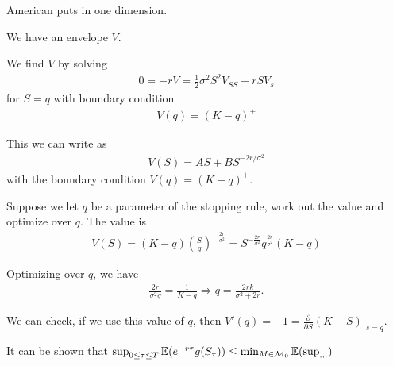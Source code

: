 \begin{exmp}
  \label{defn:market_models:5}
  American puts in one dimension.

  We have an envelope $V$.

  We find $V$ by solving
  \begin{align}
    \label{eq:140}
    0 = -rV = \frac{1}{2} \sigma^{2} S^{2} V_{SS} + rSV_{s}
  \end{align} for $S = q$ with boundary condition
  \begin{align}
    \label{eq:141}
    V(q) = (K-q)^{+}
  \end{align}

  This we can write as
  \begin{align}
    \label{eq:142}
    V(S) = AS + BS^{-2r/\sigma^{2}}
  \end{align} with the boundary condition $V(q) = (K - q)^{+}$.

  Suppose we let $q$ be a parameter of the stopping rule, work out the
  value and optimize over $q$. The value is
  \begin{align}
    \label{eq:143}
    V(S) = (K - q) (\frac{S}{q})^{-\frac{2r}{\sigma^{2}}} =
    S^{-\frac{2r}{\sigma^{2}}} q^{\frac{2r}{\sigma^{2}}}(K - q)
  \end{align}

  Optimizing over $q$, we have
  \begin{align}
    \label{eq:144}
    \frac{2r}{\sigma^{2} q} = \frac{1}{K-q} \Rightarrow q =
    \frac{2rk}{\sigma^{2} + 2r}.
  \end{align}

  We can check, if we use this value of $q$, then $V'(q) = -1 =
  \frac{\partial}{\partial S}(K - S)|_{s=q}$.

  It can be shown that $\sup_{0 \leq \tau \leq T} \E{e^{-r \tau}
    g(S_{\tau})} \leq \min_{M \in \mathcal{M}_{0}} \E{\sup_{...}}$ 
\end{exmp}





